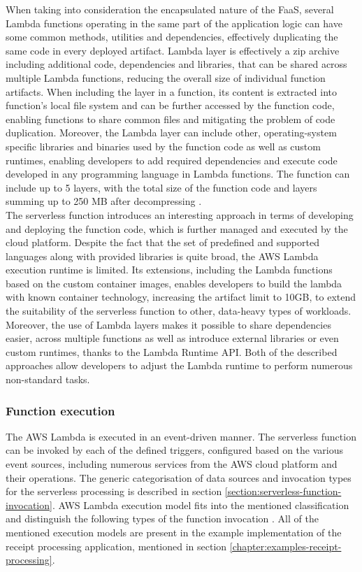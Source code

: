 When taking into consideration the encapsulated nature of the FaaS, several Lambda functions operating in the same part of the application logic can have some common methods, utilities and dependencies, effectively duplicating the same code in every deployed artifact.
Lambda layer is effectively a zip archive including additional code, dependencies and libraries, that can be shared across multiple Lambda functions, reducing the overall size of individual function artifacts.
When including the layer in a function, its content is extracted into function's local file system and can be further accessed by the function code, enabling functions to share common files and mitigating the problem of code duplication.
Moreover, the Lambda layer can include other, operating-system specific libraries and binaries used by the function code as well as custom runtimes, enabling developers to add required dependencies and execute code developed in any programming language in Lambda functions.
The function can include up to 5 layers, with the total size of the function code and layers summing up to 250 MB after decompressing \cite{AWSLambdaLayer}. \\

The serverless function introduces an interesting approach in terms of developing and deploying the function code, which is further managed and executed by the cloud platform. Despite the fact that the set of predefined and supported languages along with provided libraries is quite broad, the AWS Lambda execution runtime is limited.
Its extensions, including the Lambda functions based on the custom container images, enables developers to build the lambda with known container technology, increasing the artifact limit to 10GB, to extend the suitability of the serverless function to other, data-heavy types of workloads.
Moreover, the use of Lambda layers makes it possible to share dependencies easier, across multiple functions as well as introduce external libraries or even custom runtimes, thanks to the Lambda Runtime API.
Both of the described approaches allow developers to adjust the Lambda runtime to perform numerous non-standard tasks.

\subsubsection{Function execution} \label{chapter:lambda-function-execution-model}

The AWS Lambda is executed in an event-driven manner. 
The serverless function can be invoked by each of the defined triggers, configured based on the various event sources, including numerous services from the AWS cloud platform and their operations. 
The generic categorisation of data sources and invocation types for the serverless processing is described in section \ref{section:serverless-function-invocation}. 
AWS Lambda execution model fits into the mentioned classification and distinguish the following types of the function invocation \cite{OptimiseYourServerlessApplications}.
All of the mentioned execution models are present in the example implementation of the receipt processing application, mentioned in section \ref{chapter:examples-receipt-processing}.

